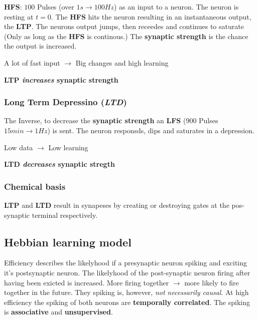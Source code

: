 \documentclass[
    fontsize      = 11pt,
    paper         = a4,
    twoside       = false,
    parskip       = half,
    pagesize      = false,
]{scrartcl}
\begin{document}
\textbf{HFS}: \(100\) Pulses (over \(1\si{s} \rightarrow 100\si{Hz}\))
as an input to a neuron. The neuron is resting at \(t=0\). The
\textbf{HFS} hits the neuron resulting in an instantaneous output, the
\textbf{LTP}. The neurons output jumps, then receedes and continues to
saturate (Only as long as the \textbf{HFS} is continous.) The
\textbf{synaptic strength} is the chance the output is increased.

A lot of fast input \(\rightarrow\) Big changes and high learning

\textbf{LTP \emph{increases} synaptic strength}

\hypertarget{long-term-depressino-ltd}{%
\subsubsection{\texorpdfstring{Long Term Depressino
(\emph{LTD})}{Long Term Depressino (LTD)}}\label{long-term-depressino-ltd}}

The Inverse, to decrease the \textbf{synaptic strength} an \textbf{LFS}
(\(900\) Pulses \(15\si{min} \rightarrow 1\si{Hz}\)) is sent. The neuron
responsds, dips and saturates in a depression.

Low data \(\rightarrow\) Low learning

\textbf{LTD \emph{decreases} synaptic stregth}

\hypertarget{chemical-basis}{%
\subsubsection{Chemical basis}\label{chemical-basis}}

\textbf{LTP} and \textbf{LTD} result in synapeses by creating or
destroying gates at the pos-synaptic terminal respectively.

\hypertarget{hebbian-learning-model}{%
\subsection{Hebbian learning model}\label{hebbian-learning-model}}

Efficiency describes the likelyhood if a presynaptic neuron spiking and
exciting it's postsynaptic neuron. The likelyhood of the post-synaptic
neuron firing after having been exicted is increased. More firing
together \(\rightarrow\) more likely to fire together in the future.
They spiking is, however, \emph{not necessarily causal}. At high
efficiency the spiking of both neurons are \textbf{temporally
correlated}. The spiking is \textbf{associative} and
\textbf{unsupervised}.
\end{document}
